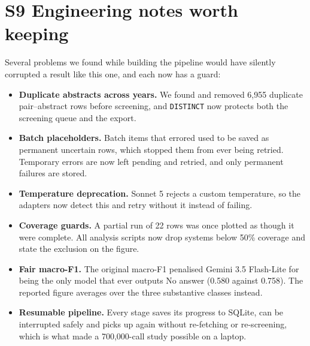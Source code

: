 \documentclass[11pt,a4paper]{article}
\begin{document}
\section{S9  Engineering notes worth keeping}
Several problems we found while building the pipeline would have silently corrupted a result like this one, and each now has a guard:

\begin{itemize}
\item \textbf{Duplicate abstracts across years.} We found and removed 6,955 duplicate pair--abstract rows before screening, and \texttt{DISTINCT} now protects both the screening queue and the export.
\item \textbf{Batch placeholders.} Batch items that errored used to be saved as permanent uncertain rows, which stopped them from ever being retried. Temporary errors are now left pending and retried, and only permanent failures are stored.
\item \textbf{Temperature deprecation.} Sonnet 5 rejects a custom temperature, so the adapters now detect this and retry without it instead of failing.
\item \textbf{Coverage guards.} A partial run of 22 rows was once plotted as though it were complete. All analysis scripts now drop systems below 50\% coverage and state the exclusion on the figure.
\item \textbf{Fair macro-F1.} The original macro-F1 penalised Gemini 3.5 Flash-Lite for being the only model that ever outputs No answer (0.580 against 0.758). The reported figure averages over the three substantive classes instead.
\item \textbf{Resumable pipeline.} Every stage saves its progress to SQLite, can be interrupted safely and picks up again without re-fetching or re-screening, which is what made a 700,000-call study possible on a laptop.
\end{itemize}
\end{document}
